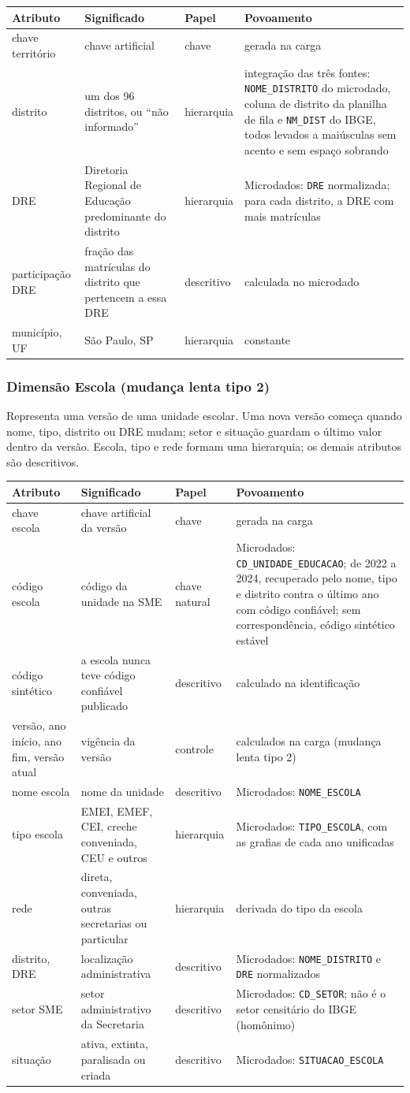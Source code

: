 \documentclass[11pt,a4paper]{article}
\newcommand{\cod}[1]{\texttt{#1}}
\newenvironment{atributos}{%
  \small
  \begin{longtable}{>{\raggedright}p{2.6cm}>{\raggedright}p{4.6cm}>{\raggedright}p{1.9cm}>{\raggedright\arraybackslash}p{5.3cm}}
  \toprule \textbf{Atributo} & \textbf{Significado} & \textbf{Papel} & \textbf{Povoamento}\\ \midrule \endhead
  \bottomrule \endlastfoot
}{\end{longtable}\addtocounter{table}{-1}}
\begin{document}
\begin{atributos}
chave território & chave artificial & chave & gerada na carga \\
distrito & um dos 96 distritos, ou ``não informado'' & hierarquia & integração das três fontes: \cod{NOME_DISTRITO} do microdado, coluna de distrito da planilha de fila e \cod{NM_DIST} do IBGE, todos levados a maiúsculas sem acento e sem espaço sobrando \\
DRE & Diretoria Regional de Educação predominante do distrito & hierarquia & Microdados: \cod{DRE} normalizada; para cada distrito, a DRE com mais matrículas \\
participação DRE & fração das matrículas do distrito que pertencem a essa DRE & descritivo & calculada no microdado \\
município, UF & São Paulo, SP & hierarquia & constante \\
\end{atributos}

\subsubsection{Dimensão Escola (mudança lenta tipo 2)}
Representa uma versão de uma unidade escolar. Uma nova versão começa quando nome, tipo, distrito ou DRE mudam; setor e situação guardam o último valor dentro da versão. Escola, tipo e rede formam uma hierarquia; os demais atributos são descritivos.

\begin{atributos}
chave escola & chave artificial da versão & chave & gerada na carga \\
código escola & código da unidade na SME & chave natural & Microdados: \cod{CD_UNIDADE_EDUCACAO}; de 2022 a 2024, recuperado pelo nome, tipo e distrito contra o último ano com código confiável; sem correspondência, código sintético estável \\
código sintético & a escola nunca teve código confiável publicado & descritivo & calculado na identificação \\
versão, ano início, ano fim, versão atual & vigência da versão & controle & calculados na carga (mudança lenta tipo 2) \\
nome escola & nome da unidade & descritivo & Microdados: \cod{NOME_ESCOLA} \\
tipo escola & EMEI, EMEF, CEI, creche conveniada, CEU e outros & hierarquia & Microdados: \cod{TIPO_ESCOLA}, com as grafias de cada ano unificadas \\
rede & direta, conveniada, outras secretarias ou particular & hierarquia & derivada do tipo da escola \\
distrito, DRE & localização administrativa & descritivo & Microdados: \cod{NOME_DISTRITO} e \cod{DRE} normalizados \\
setor SME & setor administrativo da Secretaria & descritivo & Microdados: \cod{CD_SETOR}; não é o setor censitário do IBGE (homônimo) \\
situação & ativa, extinta, paralisada ou criada & descritivo & Microdados: \cod{SITUACAO_ESCOLA} \\
\end{atributos}
\end{document}
